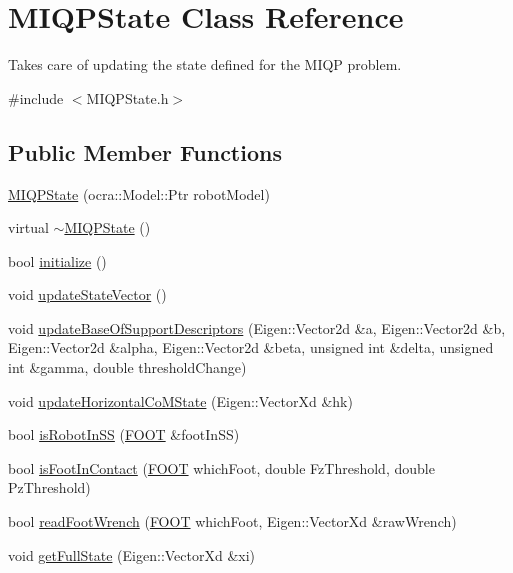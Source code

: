 \hypertarget{classMIQPState}{\section{\-M\-I\-Q\-P\-State \-Class \-Reference}
\label{classMIQPState}
}


\-Takes care of updating the state defined for the \-M\-I\-Q\-P problem.  




{\ttfamily \#include $<$\-M\-I\-Q\-P\-State.\-h$>$}

\subsection*{\-Public \-Member \-Functions}
\begin{DoxyCompactItemize}
\item 
\hyperlink{classMIQPState_aaaf6b0ca121e6a74b61605634dbb5fc3}{\-M\-I\-Q\-P\-State} (ocra\-::\-Model\-::\-Ptr robot\-Model)
\item 
virtual \hyperlink{classMIQPState_a1f2f14c183d11b3a1e323b59fe47020b}{$\sim$\-M\-I\-Q\-P\-State} ()
\item 
bool \hyperlink{classMIQPState_adbae9a43d4d510e0873995bf0016d75a}{initialize} ()
\item 
void \hyperlink{classMIQPState_a149d9bd8fd8208734e66a5f945cfe39a}{update\-State\-Vector} ()
\item 
void \hyperlink{classMIQPState_a8dec06cabde0ad186c976c0bc61c4688}{update\-Base\-Of\-Support\-Descriptors} (\-Eigen\-::\-Vector2d \&a, \-Eigen\-::\-Vector2d \&b, \-Eigen\-::\-Vector2d \&alpha, \-Eigen\-::\-Vector2d \&beta, unsigned int \&delta, unsigned int \&gamma, double threshold\-Change)
\item 
void \hyperlink{classMIQPState_a91a2e7b0415bf56fdb26625eacf106ef}{update\-Horizontal\-Co\-M\-State} (\-Eigen\-::\-Vector\-Xd \&hk)
\item 
bool \hyperlink{classMIQPState_ac098f6c3e6b585c45a5dc24d455f15c2}{is\-Robot\-In\-S\-S} (\hyperlink{utils_8h_a4b6a8e135f90bd56e5a57a60efb42529}{\-F\-O\-O\-T} \&foot\-In\-S\-S)
\item 
bool \hyperlink{classMIQPState_abc509a2d35f1d97a9ebcd1352943dadc}{is\-Foot\-In\-Contact} (\hyperlink{utils_8h_a4b6a8e135f90bd56e5a57a60efb42529}{\-F\-O\-O\-T} which\-Foot, double \-Fz\-Threshold, double \-Pz\-Threshold)
\item 
bool \hyperlink{classMIQPState_a3710c3ded4a5da84c505ee8e052021a3}{read\-Foot\-Wrench} (\hyperlink{utils_8h_a4b6a8e135f90bd56e5a57a60efb42529}{\-F\-O\-O\-T} which\-Foot, \-Eigen\-::\-Vector\-Xd \&raw\-Wrench)
\item 
void \hyperlink{classMIQPState_ae1d43385c4b25dced6952ffdfbf5043a}{get\-Full\-State} (\-Eigen\-::\-Vector\-Xd \&xi)
\end{DoxyCompactItemize}
